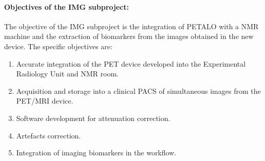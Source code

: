 \paragraph{Objectives of the IMG subproject:}

The objective of the IMG subproject is the integration of PETALO with a NMR machine and the extraction of biomarkers from the images obtained in the new device. The specific objectives are:

\begin{enumerate}
\item Accurate integration of the PET device developed into the Experimental Radiology Unit and NMR room.
\item Acquisition and storage into a clinical PACS of simultaneous images from the PET/MRI device.
\item Software development for attenuation correction.
\item Artefacts correction.
\item Integration of imaging biomarkers in the workflow.
\end{enumerate}
